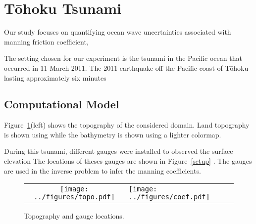 \section{T\={o}hoku Tsunami}
Our study focuses on quantifying ocean wave uncertainties associated with 
manning friction coefficient, 

The setting chosen for our experiment is the tsunami in the Pacific ocean 
that occurred in 11 March 2011. The 2011 earthquake off the Pacific coast of Tōhoku lasting approximately six minutes


\subsection{Computational Model}
Figure~\ref{fig:setup}(left) shows the topography of the considered domain.
Land topography is shown using while the bathymetry is shown using a lighter colormap.

During this tsunami, different gauges were installed to observed the surface elevation
The locations of theses gauges are shown in Figure~\ref{setup} .
The gauges are used in the inverse problem to infer the manning coefficients.

\begin{figure}[h]
\centering
\begin{tabular}{clc}
\texttt{[image: ../figures/topo.pdf]}  &
\texttt{[image: ../figures/coef.pdf]} 
\label{setup}
\end{tabular}
\caption{Topography and gauge locations.}
\label{fig:setup}
\end{figure}